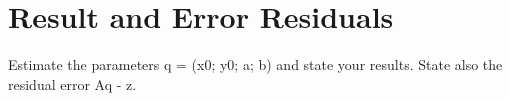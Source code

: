 \section{Result and Error Residuals}
Estimate the parameters q = (x0; y0; a; b) and state your results. State
also the residual error Aq - z.
